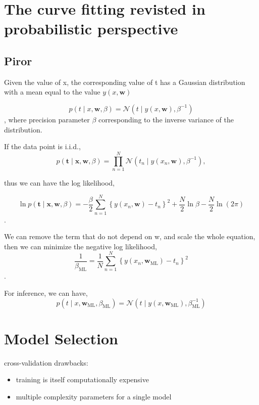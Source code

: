 \documentclass[11pt,en,cite=authoryear]{elegantpaper}
\begin{document}
\section{The curve fitting revisted in probabilistic perspective}
\subsection{Piror}
Given the value of x, the corresponding value of t has a Gaussian distribution with a mean equal to the value $y(x, \mathbf{w})$

$$p(t \mid x, \mathbf{w}, \beta)=\mathcal{N}\left(t \mid y(x, \mathbf{w}), \beta^{-1}\right)$$,
where precision parameter $\beta$ corresponding to the inverse variance of the distribution.

If the data point is i.i.d.,
$$p(\mathbf{t} \mid \mathbf{x}, \mathbf{w}, \beta)=\prod_{n=1}^{N} \mathcal{N}\left(t_{n} \mid y\left(x_{n}, \mathbf{w}\right), \beta^{-1}\right),$$

thus we can have the log likelihood,

$$\ln p(\mathbf{t} \mid \mathbf{x}, \mathbf{w}, \beta)=-\frac{\beta}{2} \sum_{n=1}^{N}\left\{y\left(x_{n}, \mathbf{w}\right)-t_{n}\right\}^{2}+\frac{N}{2} \ln \beta-\frac{N}{2} \ln (2 \pi)$$.

We can remove the term that do not depend on w, and scale the whole equation, then we can minimize the negative log likelihood,
$$\frac{1}{\beta_{\mathrm{ML}}}=\frac{1}{N} \sum_{n=1}^{N}\left\{y\left(x_{n}, \mathbf{w}_{\mathrm{ML}}\right)-t_{n}\right\}^{2}$$.

For inference, we can have,
$$
p\left(t \mid x, \mathbf{w}_{\mathrm{ML}}, \beta_{\mathrm{ML}}\right)=\mathcal{N}\left(t \mid y\left(x, \mathbf{w}_{\mathrm{ML}}\right), \beta_{\mathrm{ML}}^{-1}\right)
$$

\section{Model Selection}
cross-validation drawbacks:
\begin{itemize}
    \item training is itself computationally expensive
    \item multiple complexity parameters for a single model
\end{itemize}
\end{document}
